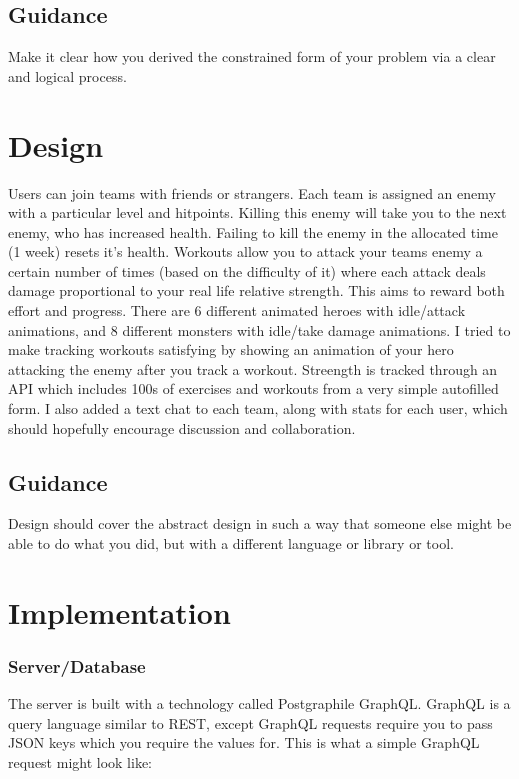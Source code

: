 \documentclass{l4proj}
\begin{document}
\section{Guidance}
Make it clear how you derived the constrained form of your problem via a clear and logical process. 

\chapter{Design}
Users can join teams with friends or strangers. Each team is assigned an enemy with a particular level and hitpoints. Killing this enemy will take you to the next enemy, who has increased health. Failing to kill the enemy in the allocated time (1 week) resets it's health. Workouts allow you to attack your teams enemy a certain number of times (based on the difficulty of it) where each attack deals damage proportional to your real life relative strength. This aims to reward both effort and progress. There are 6 different animated heroes with idle/attack animations, and 8 different monsters with idle/take damage animations. I tried to make tracking workouts satisfying by showing an animation of your hero attacking the enemy after you track a workout. Streength is tracked through an API which includes 100s of exercises and workouts from a very simple autofilled form. I also added a text chat to each team, along with stats for each user, which should hopefully encourage discussion and collaboration.
\section{Guidance}
Design should cover the abstract design in such a way that someone else might be able to do what you did, but with a different language or library or tool.

\chapter{Implementation}
\subsection{Server/Database}
The server is built with a technology called Postgraphile GraphQL. GraphQL is a query language similar to REST, except GraphQL requests require you to pass JSON keys which you require the values for. This is what a simple GraphQL request might look like: 
\end{document}
